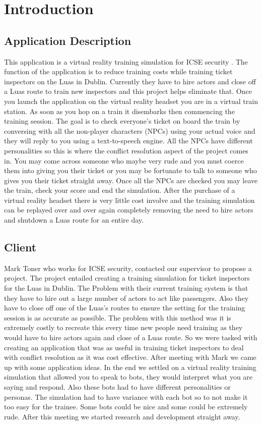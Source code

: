 \chapter{Introduction}

\section{Application Description}
This application is a virtual reality training simulation for ICSE security . The function of the application is to reduce training costs while training ticket inspectors on the Luas in Dublin. Currently they have to hire actors and close off a Luas route to train new inspectors and this project helps eliminate that. Once you launch the application on the virtual reality headset you are in a virtual train station. As soon as you hop on a train it disembarks then commencing the training session. The goal is to check everyone's ticket on board the train by conversing with all the non-player characters (NPCs) using your actual voice and they will reply to you using a text-to-speech engine. All the NPCs have different personalities so this is where the conflict resolution aspect of the project comes in. You may come across someone who maybe very rude and you must coerce them into giving you their ticket or you may be fortunate to talk to someone who gives you their ticket straight away. Once all the NPCs are checked you may leave the train, check your score and end the simulation. After the purchase of a virtual reality headset there is very little cost involve and the training simulation can be replayed over and over again completely removing the need to hire actors and shutdown a Luas route for an entire day.  

\section{Client}
Mark Toner who works for ICSE security, contacted our supervisor to propose a project. The project entailed creating a training simulation for ticket inspectors for the Luas in Dublin. The Problem with their current training system is that they have to hire out a large number of actors to act like passengers. Also they have to close off one of the Luas's routes to ensure the setting for the training session is as accurate as possible. The problem with this method was it is extremely costly to recreate this every time new people need training as they would have to hire actors again and close of a Luas route. So we were tasked with creating an application that was as useful in training ticket inspectors to deal with conflict resolution as it was cost effective. After meeting with Mark we came up with some application ideas. In the end we settled on a virtual reality training simulation that allowed you to speak to bots, they would interpret what you are saying and respond. Also these bots had to have different personalities or personas. The simulation had to have variance with each bot so to not make it too easy for the trainee. Some bots could be nice and some could be extremely rude. After this meeting we started research and development straight away.

